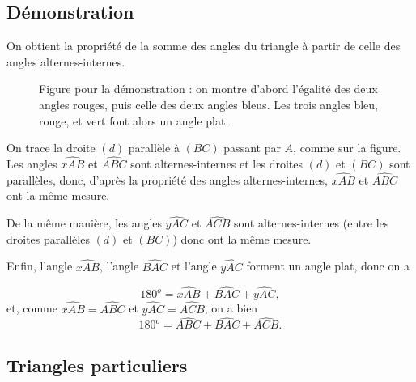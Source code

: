 \documentclass[12 pt]{article}
\theoremstyle{plain}
\newcounter{n}
\numberwithin{n}{section}
\begin{document}
\subsection{Démonstration}

On obtient la propriété de la somme des angles du triangle à partir de celle des angles alternes-internes. 
\begin{figure}[H]\center
{}\caption{Figure pour la démonstration : on montre d'abord l'égalité des deux angles rouges, puis celle des deux angles bleus. Les trois angles bleu, rouge, et vert font alors un angle plat.}
\end{figure}

On trace la droite $(d)$ parallèle à $(BC)$ passant par $A$, comme sur la figure. 
Les angles $\widehat{xAB}$ et $\widehat{ABC}$ sont alternes-internes et les droites $(d)$ et $(BC)$ sont 
parallèles, donc, d'après la propriété des angles alternes-internes, $\widehat{xAB}$ et $\widehat{ABC}$
ont la même mesure. 

De la même manière, les angles $\widehat{yAC}$ et $\widehat{ACB}$ sont alternes-internes (entre les droites parallèles 
$(d)$ et $(BC)$) donc ont la même 
mesure. 

Enfin, l'angle $\widehat{xAB}$, l'angle $\widehat{BAC}$ et l'angle $\widehat{yAC}$ forment un angle plat, donc on a

\[180^o = \widehat{xAB} + \widehat{BAC}+ \widehat{yAC}, \]
et, comme $\widehat{xAB}= \widehat{ABC}$ et $\widehat{yAC}=\widehat{ACB}$, on a bien 
 \[180^o=\widehat{ABC} + \widehat{BAC}+ \widehat{ACB}.\]

\subsection{Triangles particuliers}
\end{document}
